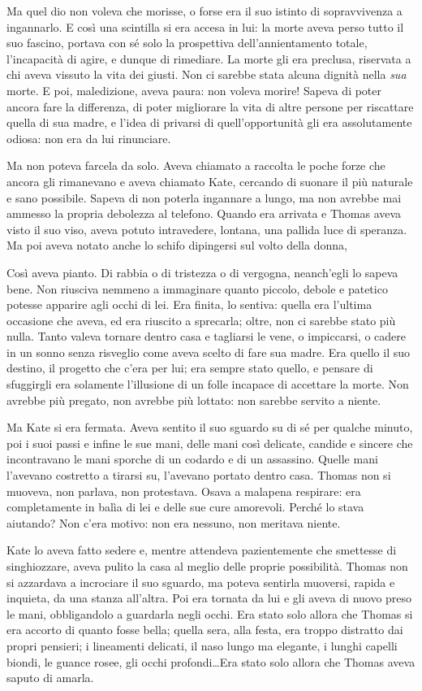 Ma quel dio non voleva che morisse, o forse era il suo istinto di sopravvivenza a ingannarlo. E così
una scintilla si era accesa in lui: la morte aveva perso tutto il suo fascino, portava con sé solo
la prospettiva dell'annientamento totale, l'incapacità di agire, e dunque di rimediare. La morte gli
era preclusa, riservata a chi aveva vissuto la vita dei giusti. Non ci sarebbe stata alcuna dignità
nella \emph{sua} morte. E poi, maledizione, aveva paura: non voleva morire! Sapeva di poter ancora
fare la differenza, di poter migliorare la vita di altre persone per riscattare quella di sua madre,
e l'idea di privarsi di quell'opportunità gli era assolutamente odiosa: non era da lui rinunciare.

Ma non poteva farcela da solo. Aveva chiamato a raccolta le poche forze che ancora gli rimanevano e
aveva chiamato Kate, cercando di suonare il più naturale e sano possibile. Sapeva di non poterla
ingannare a lungo, ma non avrebbe mai ammesso la propria debolezza al telefono. Quando era arrivata
e Thomas aveva visto il suo viso, aveva potuto intravedere, lontana, una pallida luce di speranza.
Ma poi aveva notato anche lo schifo dipingersi sul volto della donna,

Così aveva pianto. Di rabbia o di tristezza o di vergogna, neanch'egli lo sapeva bene. Non riusciva
nemmeno a immaginare quanto piccolo, debole e patetico potesse apparire agli occhi di lei. Era
finita, lo sentiva: quella era l'ultima occasione che aveva, ed era riuscito a sprecarla; oltre, non
ci sarebbe stato più nulla. Tanto valeva tornare dentro casa e tagliarsi le vene, o impiccarsi, o
cadere in un sonno senza risveglio come aveva scelto di fare sua madre. Era quello il suo destino,
il progetto che c'era per lui; era sempre stato quello, e pensare di sfuggirgli era solamente
l'illusione di un folle incapace di accettare la morte. Non avrebbe più pregato, non avrebbe più
lottato: non sarebbe servito a niente.

Ma Kate si era fermata. Aveva sentito il suo sguardo su di sé per qualche minuto, poi i suoi passi e
infine le sue mani, delle mani così delicate, candide e sincere che incontravano le mani sporche di
un codardo e di un assassino. Quelle mani l'avevano costretto a tirarsi su, l'avevano portato dentro
casa. Thomas non si muoveva, non parlava, non protestava. Osava a malapena respirare: era
completamente in balìa di lei e delle sue cure amorevoli. Perché lo stava aiutando? Non c'era
motivo: non era nessuno, non meritava niente.

Kate lo aveva fatto sedere e, mentre attendeva pazientemente che smettesse di singhiozzare, aveva
pulito la casa al meglio delle proprie possibilità. Thomas non si azzardava a incrociare il suo
sguardo, ma poteva sentirla muoversi, rapida e inquieta, da una stanza all'altra. Poi era tornata da
lui e gli aveva di nuovo preso le mani, obbligandolo a guardarla negli occhi. Era stato solo allora
che Thomas si era accorto di quanto fosse bella; quella sera, alla festa, era troppo distratto dai
propri pensieri; i lineamenti delicati, il naso lungo ma elegante, i lunghi capelli biondi, le
guance rosee, gli occhi profondi\dots Era stato solo allora che Thomas aveva saputo di amarla.

